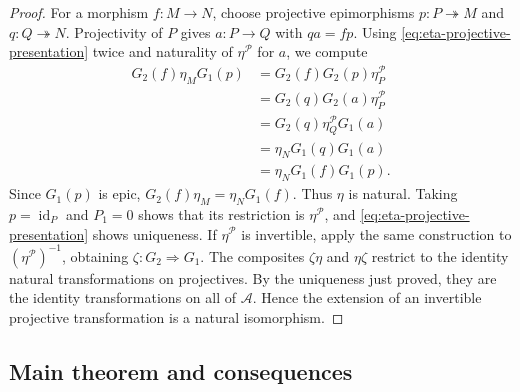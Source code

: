 \documentclass[12pt,leqno]{amsart}
\numberwithin{equation}{section}
\newcommand{\id}{\operatorname{id}}
\begin{document}
\begin{proof}
For a morphism $f:M\to N$, choose projective epimorphisms
$p:P\twoheadrightarrow M$ and $q:Q\twoheadrightarrow N$.  Projectivity of
$P$ gives $a:P\to Q$ with $qa=fp$.  Using
\eqref{eq:eta-projective-presentation} twice and naturality of
$\eta^{\mathcal P}$ for $a$, we compute
\begin{align*}
 G_2(f)\eta_MG_1(p)
 &=G_2(f)G_2(p)\eta^{\mathcal P}_P\\
 &=G_2(q)G_2(a)\eta^{\mathcal P}_P\\
 &=G_2(q)\eta^{\mathcal P}_QG_1(a)\\
 &=\eta_NG_1(q)G_1(a)\\
 &=\eta_NG_1(f)G_1(p).
\end{align*}
Since $G_1(p)$ is epic, $G_2(f)\eta_M=\eta_NG_1(f)$.  Thus $\eta$ is
natural.  Taking $p=\id_P$ and $P_1=0$ shows that its restriction is
$\eta^{\mathcal P}$, and \eqref{eq:eta-projective-presentation} shows
uniqueness.  If $\eta^{\mathcal P}$ is invertible, apply the same construction to
$(\eta^{\mathcal P})^{-1}$, obtaining $\zeta:G_2\Rightarrow G_1$.
The composites $\zeta\eta$ and $\eta\zeta$ restrict to the identity
natural transformations on projectives.  By the uniqueness just proved,
they are the identity transformations on all of $\mathcal A$.  Hence the
extension of an invertible projective transformation is a natural
isomorphism.
\end{proof}

\subsection{Main theorem and consequences}
\end{document}
